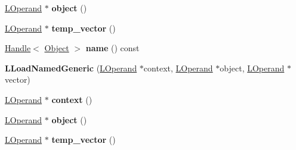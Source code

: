 \begin{DoxyCompactItemize}
\item 
\hyperlink{classv8_1_1internal_1_1_l_operand}{L\+Operand} $\ast$ {\bfseries object} ()\hypertarget{classv8_1_1internal_1_1_l_load_named_generic_ac545174d6ce0223254278aa25992bcf1}{}\label{classv8_1_1internal_1_1_l_load_named_generic_ac545174d6ce0223254278aa25992bcf1}

\item 
\hyperlink{classv8_1_1internal_1_1_l_operand}{L\+Operand} $\ast$ {\bfseries temp\+\_\+vector} ()\hypertarget{classv8_1_1internal_1_1_l_load_named_generic_ac71e90a4f4d755276a1d76ac24d4ef3d}{}\label{classv8_1_1internal_1_1_l_load_named_generic_ac71e90a4f4d755276a1d76ac24d4ef3d}

\item 
\hyperlink{classv8_1_1internal_1_1_handle}{Handle}$<$ \hyperlink{classv8_1_1internal_1_1_object}{Object} $>$ {\bfseries name} () const \hypertarget{classv8_1_1internal_1_1_l_load_named_generic_a328fcd03d981c29639521ee005f3adc7}{}\label{classv8_1_1internal_1_1_l_load_named_generic_a328fcd03d981c29639521ee005f3adc7}

\item 
{\bfseries L\+Load\+Named\+Generic} (\hyperlink{classv8_1_1internal_1_1_l_operand}{L\+Operand} $\ast$context, \hyperlink{classv8_1_1internal_1_1_l_operand}{L\+Operand} $\ast$object, \hyperlink{classv8_1_1internal_1_1_l_operand}{L\+Operand} $\ast$vector)\hypertarget{classv8_1_1internal_1_1_l_load_named_generic_a6994bc2c7c479c721ec11114ed19423c}{}\label{classv8_1_1internal_1_1_l_load_named_generic_a6994bc2c7c479c721ec11114ed19423c}

\item 
\hyperlink{classv8_1_1internal_1_1_l_operand}{L\+Operand} $\ast$ {\bfseries context} ()\hypertarget{classv8_1_1internal_1_1_l_load_named_generic_a61d03d8bff411819ec103caee4b20d95}{}\label{classv8_1_1internal_1_1_l_load_named_generic_a61d03d8bff411819ec103caee4b20d95}

\item 
\hyperlink{classv8_1_1internal_1_1_l_operand}{L\+Operand} $\ast$ {\bfseries object} ()\hypertarget{classv8_1_1internal_1_1_l_load_named_generic_ac545174d6ce0223254278aa25992bcf1}{}\label{classv8_1_1internal_1_1_l_load_named_generic_ac545174d6ce0223254278aa25992bcf1}

\item 
\hyperlink{classv8_1_1internal_1_1_l_operand}{L\+Operand} $\ast$ {\bfseries temp\+\_\+vector} ()\hypertarget{classv8_1_1internal_1_1_l_load_named_generic_ac71e90a4f4d755276a1d76ac24d4ef3d}{}\label{classv8_1_1internal_1_1_l_load_named_generic_ac71e90a4f4d755276a1d76ac24d4ef3d}


\end{DoxyCompactItemize}
